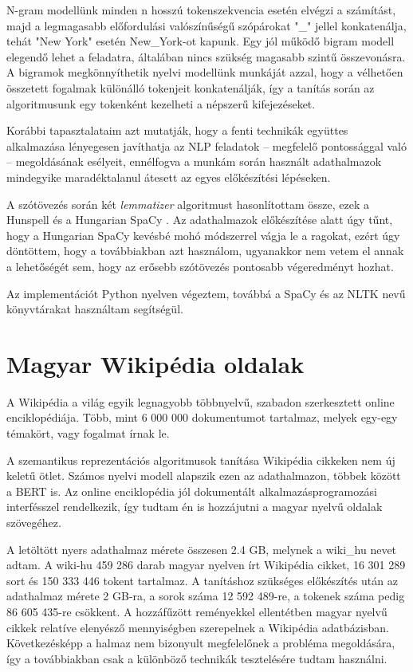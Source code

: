 N-gram modellünk minden n hosszú tokenszekvencia esetén elvégzi a számítást, majd a legmagasabb előfordulási valószínűségű szópárokat "\_" jellel konkatenálja, tehát "New York" esetén New\_York-ot kapunk. Egy jól működő bigram modell elegendő lehet a feladatra, általában nincs szükség magasabb szintű összevonásra. A bigramok megkönnyíthetik nyelvi modellünk munkáját azzal, hogy a vélhetően összetett fogalmak különálló tokenjeit konkatenálják, így a tanítás során az algoritmusunk egy tokenként kezelheti a népszerű kifejezéseket.

Korábbi tapasztalataim azt mutatják, hogy a fenti technikák együttes alkalmazása lényegesen javíthatja az NLP feladatok – megfelelő pontossággal való – megoldásának esélyeit, ennélfogva a munkám során használt adathalmazok mindegyike maradéktalanul átesett az egyes előkészítési lépéseken.

A szótövezés során két \textit{lemmatizer} algoritmust hasonlítottam össze, ezek a Hunspell \cite{hunspell} és a Hungarian SpaCy \cite{hunspacy}. Az adathalmazok előkészítése alatt úgy tűnt, hogy a Hungarian SpaCy kevésbé mohó módszerrel vágja le a ragokat, ezért úgy döntöttem, hogy a továbbiakban azt használom, ugyanakkor nem vetem el annak a lehetőségét sem, hogy az erősebb szótövezés pontosabb végeredményt hozhat. 

Az implementációt Python nyelven végeztem, továbbá a SpaCy \cite{spacy} és az NLTK \cite{nltk} nevű könyvtárakat használtam segítségül.

\section{Magyar Wikipédia oldalak}
A Wikipédia \cite{wikipedia} a világ egyik legnagyobb többnyelvű, szabadon szerkesztett online enciklopédiája. Több, mint 6 000 000 dokumentumot tartalmaz, melyek egy-egy témakört, vagy fogalmat írnak le.

A szemantikus reprezentációs algoritmusok tanítása Wikipédia cikkeken nem új keletű ötlet. Számos nyelvi modell alapszik ezen az adathalmazon, többek között a BERT is.
Az online enciklopédia jól dokumentált alkalmazásprogramozási interfésszel rendelkezik, így tudtam én is hozzájutni a magyar nyelvű oldalak szövegéhez.

A letöltött nyers adathalmaz mérete összesen 2.4 GB, melynek a wiki\_hu nevet adtam. A wiki-hu 459 286 darab magyar nyelven írt Wikipédia cikket, 16 301 289 sort és 150 333 446 tokent tartalmaz. 
A tanításhoz szükséges előkészítés után az adathalmaz mérete 2 GB-ra, a sorok száma 12 592 489-re, a tokenek száma pedig 86 605 435-re csökkent.
A hozzáfűzött reményekkel ellentétben magyar nyelvű cikkek relatíve elenyésző mennyiségben szerepelnek a Wikipédia adatbázisban. Következésképp a halmaz nem bizonyult megfelelőnek a probléma megoldására, így a továbbiakban csak a különböző technikák tesztelésére tudtam használni.


